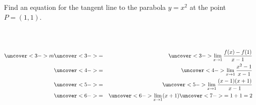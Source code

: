 \begin{frame}
\begin{example}[Example 1, p. 113]
Find an equation for the tangent line to the parabola $y = x^2$ at the point $P = (1,1)$.

\begin{columns}[c]
\ %
%
\begin{eqnarray*}
\uncover<3->{m} & \uncover<3->{ = } & \uncover<3->{\lim_{x\rightarrow 1} \frac{f(x)-f(1)}{x-1}}\\
& \uncover<4->{ = } & %
\uncover<4->{\lim_{x\rightarrow 1}\frac{x^2 - 1}{x-1}}\\
& \uncover<5->{ = } & %
\uncover<5->{\lim_{x\rightarrow 1}\frac{(x - 1)(x+1)}{x-1}}\\
& \uncover<6->{ = } & %
\uncover<6->{\lim_{x\rightarrow 1}(x+1)}\uncover<7->{ = 1 + 1 = 2}
\end{eqnarray*}
\end{columns}
\end{example}
\end{frame}
